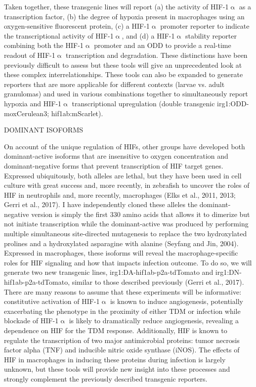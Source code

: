Taken together, these transgenic lines will report (a) the activity of HIF-1$\upalpha$ as a transcription factor, (b) the degree of hypoxia present in macrophages using an oxygen-sensitive fluorescent protein, (c) a HIF-1$\upalpha$ promoter reporter to indicate the transcriptional activity of HIF-1$\upalpha$, and (d) a HIF-1$\upalpha$ stability reporter combining both the HIF-1$\upalpha$ promoter and an ODD to provide a real-time readout of HIF-1$\upalpha$ transcription and degradation. These distinctions have been previously difficult to assess but these tools will give an unprecedented look at these complex interrelationships. These tools can also be expanded to generate reporters that are more applicable for different contexts (larvae vs. adult granulomas) and used in various combinations together to simultaneously report hypoxia and HIF-1$\upalpha$ transcriptional upregulation (double transgenic irg1:ODD-moxCerulean3; hif1ab:mScarlet).

DOMINANT ISOFORMS

On account of the unique regulation of HIFs, other groups have developed both dominant-active isoforms that are insensitive to oxygen concentration and dominant-negative forms that prevent transcription of HIF target genes. Expressed ubiquitously, both alleles are lethal, but they have been used in cell culture with great success and, more recently, in zebrafish to uncover the roles of HIF in neutrophils and, more recently, macrophages (Elks et al., 2011, 2013; Gerri et al., 2017). I have independently cloned these alleles  the dominant-negative version is simply the first 330 amino acids that allows it to dimerize but not initiate transcription while the dominant-active was produced by performing multiple simultaneous site-directed mutagenesis to replace the two hydroxylated prolines and a hydroxylated asparagine with alanine (Seyfang and Jin, 2004).
Expressed in macrophages, these isoforms will reveal the macrophage-specific roles for HIF signaling and how that impacts infection outcome. To do so, we will generate two new transgenic lines, irg1:DA-hif1ab-p2a-tdTomato and irg1:DN-hif1ab-p2a-tdTomato, similar to those described previously (Gerri et al., 2017). There are many reasons to assume that these experiments will be informative: constitutive activation of HIF-1$\upalpha$ is known to induce angiogenesis, potentially exacerbating the phenotype in the proximity of either TDM or infection while blockade of HIF-1$\upalpha$ is likely to dramatically reduce angiogenesis, revealing a dependence on HIF for the TDM response. Additionally, HIF is known to regulate the transcription of two major antimicrobial proteins: tumor necrosis factor alpha (TNF) and inducible nitric oxide synthase (iNOS). The effects of HIF in macrophages in inducing these proteins during infection is largely unknown, but these tools will provide new insight into these processes and strongly complement the previously described transgenic reporters.  

